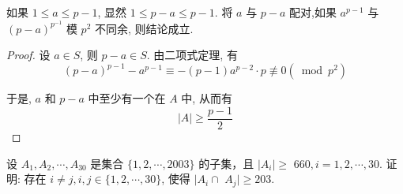 \begin{analysis}
	如果 $1 \leqslant a \leqslant p-1$, 显然 $1 \leqslant p-a \leqslant p-1$. 将 $a$ 与 $p-a$ 配对,如果 $a^{p-1}$ 与 $(p-a)^{p^{-1}}$ 模 $p^{2}$ 不同余, 则结论成立.
\end{analysis}

\begin{proof}
	设 $a \in S$, 则 $p-a \in S$. 由二项式定理, 有
	$$
		(p-a)^{p-1}-a^{p-1} \equiv-(p-1) a^{p-2} \cdot p \not \equiv 0\left(\bmod p^{2}\right)
	$$

	于是, $a$ 和 $p-a$ 中至少有一个在 $A$ 中, 从而有
	$$
		|A| \geqslant \frac{p-1}{2}
	$$
\end{proof}

\begin{example}
	设 $A_{1}, A_{2}, \cdots, A_{30}$ 是集合 $\{1,2, \cdots, 2003\}$ 的子集，且 $\left|A_{i}\right| \geqslant$ $660, i=1,2, \cdots, 30$. 证明: 存在 $i \neq j, i, j \in\{1,2, \cdots, 30\}$, 使得 $\mid A_{i} \cap$ $A_{j} \mid \geqslant 203$.
\end{example}

